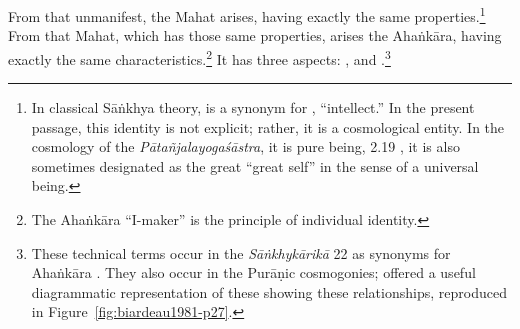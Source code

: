 \begin{translation}
\item[3.1.4]
\label{3.1.4}
From that unmanifest, the Mahat arises, having exactly the same
properties.\footnote{In classical Sāṅkhya theory,  is a
    synonym for , ``intellect.''  In the present passage, this
    identity is not explicit; rather, it is a cosmological entity.  In the
    cosmology of the \emph{Pātañjalayogaśāstra}, it is pure being,
     2.19 \citep[85]{agas-1904}, it is also sometimes
    designated as the great  ``great self'' in the sense of a
    universal being.} %
    From that Mahat, which has those same properties, arises the
    Ahaṅkāra, having exactly the same characteristics.\footnote{The
        Ahaṅkāra ``I-maker'' is the principle of individual identity.}  It
        has three aspects: , 
        and .\footnote{\label{puraniccosmology}These 
        technical terms occur in the \emph{Sāṅkhykārikā} 22 as synonyms for 
        Ahaṅkāra \parencites[46--47]{sast-1948}[187--188]{wezl-1998}. They 
        also occur in the Purāṇic cosmogonies; \citet[27]{biar-1981} offered a 
        useful diagrammatic representation of these showing these relationships, 
        reproduced in Figure~\ref{fig:biardeau1981-p27}.}
          
            \begin{figure}
                \centering
\end{figure}
\end{translation}
